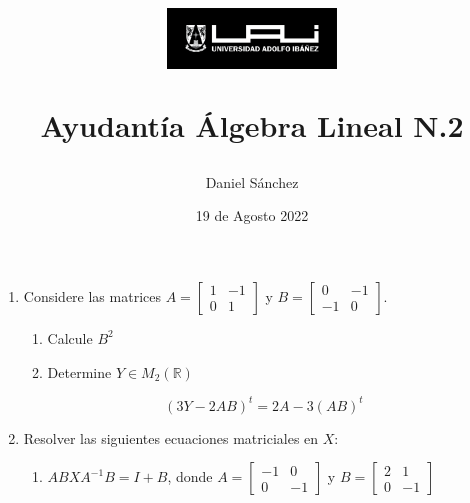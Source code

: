 \documentclass[12pt]{article}
\begin{document}
\title{
    \begin{figure}[ht]
        \centering
        \includegraphics[width = 0.4\textwidth, ]{logo-uai.jpg}\\
    \end{figure}
    Ayudant\'ia \'Algebra Lineal N.2}
\date{19 de Agosto 2022}
\author{Daniel S\'anchez}
\maketitle

\begin{enumerate}
    \item Considere las matrices
          $A=
              \begin{bmatrix}
                  1 & -1 \\
                  0 & 1
              \end{bmatrix}$
          y
          $B=
              \begin{bmatrix}
                  0  & -1 \\
                  -1 & 0
              \end{bmatrix}$.
          \begin{enumerate}
              \item Calcule $B^2$
              \item Determine $Y \in M_2(\mathbb{R})$
          \end{enumerate}
          $$ (3Y-2AB)^t=2A-3(AB)^t$$
          
          
    \item Resolver las siguientes ecuaciones matriciales en $X$:
          \begin{enumerate}
              \item $ABXA^{-1}B=I+B$, donde $A=
                        \begin{bmatrix}
                            -1 & 0  \\
                            0  & -1
                        \end{bmatrix}$
                    y
                    $B=
                        \begin{bmatrix}
                            2 & 1  \\
                            0 & -1
                        \end{bmatrix}$
                    

\end{enumerate}
\end{enumerate}
\end{document}
